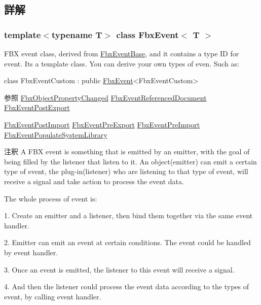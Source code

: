 \subsection{詳解}
\subsubsection*{template$<$typename T$>$\newline
class Fbx\+Event$<$ T $>$}

F\+BX event class, derived from \hyperlink{class_fbx_event_base}{Fbx\+Event\+Base}, and it contains a type ID for event. It\textquotesingle{}s a template class. You can derive your own types of even. Such as\+: 
\begin{DoxyCode}
\textcolor{keyword}{class }FbxEventCustom : \textcolor{keyword}{public} \hyperlink{class_fbx_event}{FbxEvent}<FbxEventCustom> 
\end{DoxyCode}
 \begin{DoxySeeAlso}{参照}
\hyperlink{class_fbx_object_property_changed}{Fbx\+Object\+Property\+Changed} \hyperlink{class_fbx_event_referenced_document}{Fbx\+Event\+Referenced\+Document} \hyperlink{class_fbx_event_post_export}{Fbx\+Event\+Post\+Export} 

\hyperlink{class_fbx_event_post_import}{Fbx\+Event\+Post\+Import} \hyperlink{class_fbx_event_pre_export}{Fbx\+Event\+Pre\+Export} \hyperlink{class_fbx_event_pre_import}{Fbx\+Event\+Pre\+Import} \hyperlink{class_fbx_event_populate_system_library}{Fbx\+Event\+Populate\+System\+Library}
\end{DoxySeeAlso}
\begin{DoxyRemark}{注釈}
A F\+BX event is something that is emitted by an emitter, with the goal of being filled by the listener that listen to it. An object(emitter) can emit a certain type of event, the plug-\/in(listener) who are listening to that type of event, will receive a signal and take action to process the event data. 
\end{DoxyRemark}
\begin{DoxyParagraph}{The whole process of event is\+:}
\begin{DoxyItemize}
\item 1. Create an emitter and a listener, then bind them together via the same event handler. \item 2. Emitter can emit an event at certain conditions. The event could be handled by event handler. \item 3. Once an event is emitted, the listener to this event will receive a signal. \item 4. And then the listener could process the event data according to the types of event, by calling event handler. \end{DoxyItemize}

\end{DoxyParagraph}
